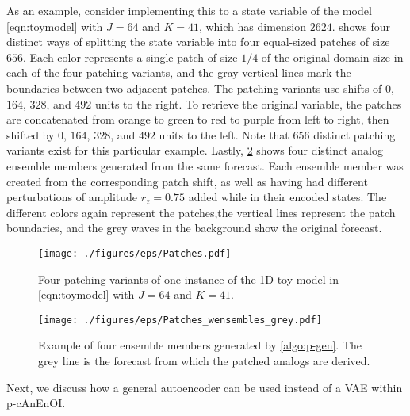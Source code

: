 \documentclass[final,3p]{elsarticle}
\theoremstyle{break}
\begin{document}
As an example, consider implementing this to a state variable of the model \cref{eqn:toymodel} with $J=64$ and $K=41$, which has dimension $2624$.
 shows four distinct ways of splitting the state variable into four equal-sized patches of size $656$. 
Each color represents a single patch of size $1/4$ of the original domain size in each of the four patching variants, and the gray vertical lines mark the boundaries between two adjacent patches.
The patching variants use shifts of $0$, $164$, $328$, and $492$ units to the right. 
To retrieve the original variable, the patches are concatenated from orange to green to red to purple from left to right, then shifted by $0$, $164$, $328$, and $492$ units to the left.
Note that $656$ distinct patching variants exist for this particular example.
Lastly, \cref{fig:patches_ensemble} shows four distinct analog ensemble members generated from the same forecast.
Each ensemble member was created from the corresponding patch shift, as well as having had different perturbations of amplitude $r_z=0.75$ added while in their encoded states.
The different colors again represent the patches,the vertical lines represent the patch boundaries, and the grey waves in the background show the original forecast.
\begin{figure}[t]
    \centering
    \texttt{[image: ./figures/eps/Patches.pdf]}
    \caption{\label{fig:patches} Four patching variants of one instance of the 1D toy model in \cref{eqn:toymodel} with $J=64$ and $K=41$.}
\end{figure}
\begin{figure}[h]
    \centering
    \texttt{[image: ./figures/eps/Patches\_wensembles\_grey.pdf]}
    \caption{\label{fig:patches_ensemble} Example of four ensemble members generated by \cref{algo:p-gen}. The grey line is the forecast from which the patched analogs are derived.}
\end{figure}
Next, we discuss how a general autoencoder can be used instead of a VAE within p-cAnEnOI.
\end{document}
